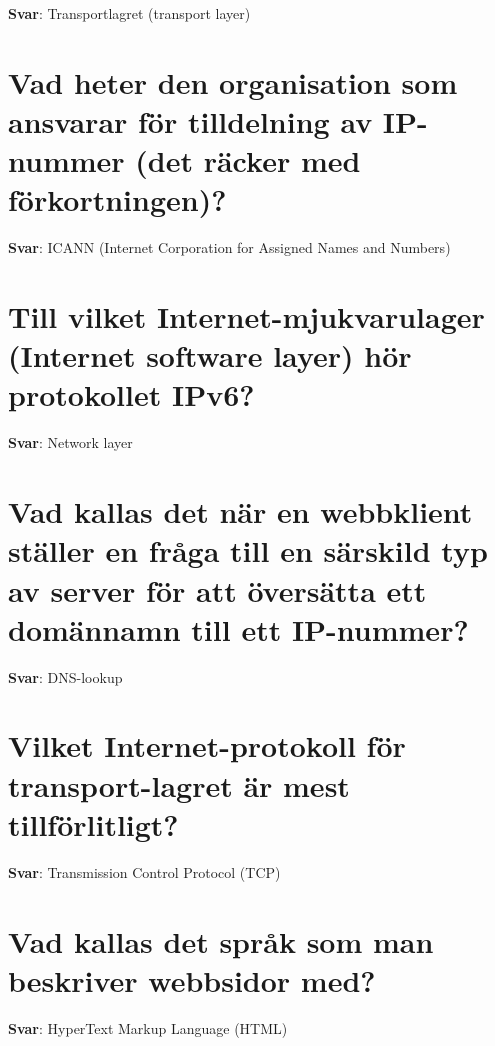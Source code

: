\documentclass[a4paper,11pt,oneside]{book}
\begin{document}
\begin{sloppypar}
\label{q:22:sa:sv:True}

\textbf{Svar}: Transportlagret (transport layer)



\section{Vad heter den organisation som ansvarar f\"or tilldelning av IP-nummer (det r\"acker med f\"orkortningen)?}

\label{q:23:sa:sv:True}

\textbf{Svar}: ICANN (Internet Corporation for Assigned Names and Numbers)



\section{Till vilket Internet-mjukvarulager (Internet software layer) h\"or protokollet IPv6?}

\label{q:24:sa:sv:True}

\textbf{Svar}: Network layer



\section{Vad kallas det n\"ar en webbklient st\"aller en fr\r{a}ga till en s\"arskild typ av server f\"or att \"overs\"atta ett dom\"annamn till ett IP-nummer?}

\label{q:25:sa:sv:True}

\textbf{Svar}: DNS-lookup



\section{Vilket Internet-protokoll f\"or transport-lagret \"ar mest tillf\"orlitligt?}

\label{q:26:sa:sv:True}

\textbf{Svar}: Transmission Control Protocol (TCP)



\section{Vad kallas det spr\r{a}k som man beskriver webbsidor med?}

\label{q:27:sa:sv:True}

\textbf{Svar}: HyperText Markup Language (HTML)




\end{sloppypar}
\end{document}
